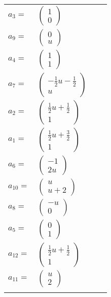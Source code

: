 \documentclass[1p]{elsarticle_modified}
\theoremstyle{definition}
\begin{document}
\begin{tabular}{m{7pt} m{180pt} m{7pt} m{180pt} }
\flushright $a_{3}=$&$\begin{pmatrix}1\\0\end{pmatrix}$ \\
\flushright $a_{9}=$&$\begin{pmatrix}0\\u\end{pmatrix}$ \\
\flushright $a_{4}=$&$\begin{pmatrix}1\\1\end{pmatrix}$ \\
\flushright $a_{7}=$&$\begin{pmatrix}-\frac{1}{2} u-\frac{1}{2}\\u\end{pmatrix}$ \\
\flushright $a_{2}=$&$\begin{pmatrix}\frac{1}{2} u+\frac{1}{2}\\1\end{pmatrix}$ \\
\flushright $a_{1}=$&$\begin{pmatrix}\frac{1}{2} u+\frac{3}{2}\\1\end{pmatrix}$ \\
\flushright $a_{6}=$&$\begin{pmatrix}-1\\2 u\end{pmatrix}$ \\
\flushright $a_{10}=$&$\begin{pmatrix}u\\u+2\end{pmatrix}$ \\
\flushright $a_{8}=$&$\begin{pmatrix}- u\\0\end{pmatrix}$ \\
\flushright $a_{5}=$&$\begin{pmatrix}0\\1\end{pmatrix}$ \\
\flushright $a_{12}=$&$\begin{pmatrix}\frac{1}{2} u+\frac{1}{2}\\1\end{pmatrix}$ \\
\flushright $a_{11}=$&$\begin{pmatrix}u\\2\end{pmatrix}$\\&\end{tabular}
\end{document}

